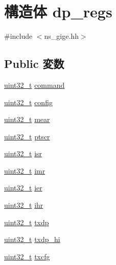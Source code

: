 \hypertarget{structdp__regs}{
\section{構造体 dp\_\-regs}
\label{structdp__regs}
}


{\ttfamily \#include $<$ns\_\-gige.hh$>$}\subsection*{Public 変数}
\begin{DoxyCompactItemize}
\item 
\hyperlink{Type_8hh_a435d1572bf3f880d55459d9805097f62}{uint32\_\-t} \hyperlink{structdp__regs_af7e471411e95448316f756e3905fdcce}{command}
\item 
\hyperlink{Type_8hh_a435d1572bf3f880d55459d9805097f62}{uint32\_\-t} \hyperlink{structdp__regs_ac0c635110dc503f164fff91b163936d7}{config}
\item 
\hyperlink{Type_8hh_a435d1572bf3f880d55459d9805097f62}{uint32\_\-t} \hyperlink{structdp__regs_ad3e9e94078f4fb898b8feaae531ffe5b}{mear}
\item 
\hyperlink{Type_8hh_a435d1572bf3f880d55459d9805097f62}{uint32\_\-t} \hyperlink{structdp__regs_a1f01c3e526ade3b19c318b11ed2c67c9}{ptscr}
\item 
\hyperlink{Type_8hh_a435d1572bf3f880d55459d9805097f62}{uint32\_\-t} \hyperlink{structdp__regs_aa93dbf6631982c0e4a8b1ee58d247637}{isr}
\item 
\hyperlink{Type_8hh_a435d1572bf3f880d55459d9805097f62}{uint32\_\-t} \hyperlink{structdp__regs_a781580e46c65f953e6db9e3c415bece1}{imr}
\item 
\hyperlink{Type_8hh_a435d1572bf3f880d55459d9805097f62}{uint32\_\-t} \hyperlink{structdp__regs_a596051ae0d85d0e2ff27f3d8960e4d4d}{ier}
\item 
\hyperlink{Type_8hh_a435d1572bf3f880d55459d9805097f62}{uint32\_\-t} \hyperlink{structdp__regs_a81a49960fa9890d6a9bd4af9a3c95149}{ihr}
\item 
\hyperlink{Type_8hh_a435d1572bf3f880d55459d9805097f62}{uint32\_\-t} \hyperlink{structdp__regs_ae5f7f162f770bcb6f994482964610c5a}{txdp}
\item 
\hyperlink{Type_8hh_a435d1572bf3f880d55459d9805097f62}{uint32\_\-t} \hyperlink{structdp__regs_a5644814c8086c13ab436442d928f3762}{txdp\_\-hi}
\item 
\hyperlink{Type_8hh_a435d1572bf3f880d55459d9805097f62}{uint32\_\-t} \hyperlink{structdp__regs_a94237474f80bfbe5379422f62406c3c7}{txcfg}

\end{DoxyCompactItemize}
